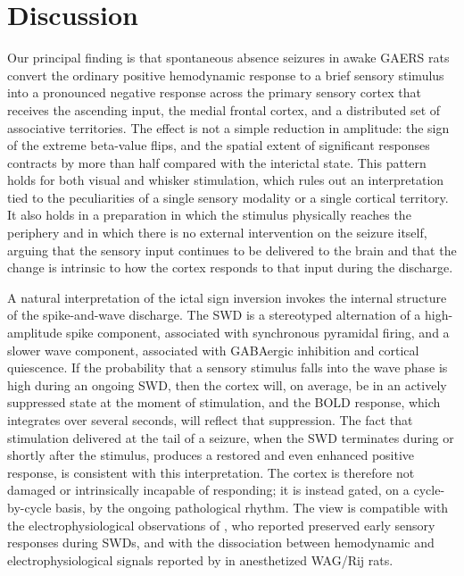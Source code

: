 \documentclass[11pt]{article}
\begin{document}
\section{Discussion}

Our principal finding is that spontaneous absence seizures in awake GAERS rats convert the ordinary positive hemodynamic response to a brief sensory stimulus into a pronounced negative response across the primary sensory cortex that receives the ascending input, the medial frontal cortex, and a distributed set of associative territories. The effect is not a simple reduction in amplitude: the sign of the extreme beta-value flips, and the spatial extent of significant responses contracts by more than half compared with the interictal state. This pattern holds for both visual and whisker stimulation, which rules out an interpretation tied to the peculiarities of a single sensory modality or a single cortical territory. It also holds in a preparation in which the stimulus physically reaches the periphery and in which there is no external intervention on the seizure itself, arguing that the sensory input continues to be delivered to the brain and that the change is intrinsic to how the cortex responds to that input during the discharge.

A natural interpretation of the ictal sign inversion invokes the internal structure of the spike-and-wave discharge. The SWD is a stereotyped alternation of a high-amplitude spike component, associated with synchronous pyramidal firing, and a slower wave component, associated with GABAergic inhibition and cortical quiescence. If the probability that a sensory stimulus falls into the wave phase is high during an ongoing SWD, then the cortex will, on average, be in an actively suppressed state at the moment of stimulation, and the BOLD response, which integrates over several seconds, will reflect that suppression. The fact that stimulation delivered at the tail of a seizure, when the SWD terminates during or shortly after the stimulus, produces a restored and even enhanced positive response, is consistent with this interpretation. The cortex is therefore not damaged or intrinsically incapable of responding; it is instead gated, on a cycle-by-cycle basis, by the ongoing pathological rhythm. The view is compatible with the electrophysiological observations of \citet{chipaux2013}, who reported preserved early sensory responses during SWDs, and with the dissociation between hemodynamic and electrophysiological signals reported by \citet{mishra2011} in anesthetized WAG/Rij rats.
\end{document}
